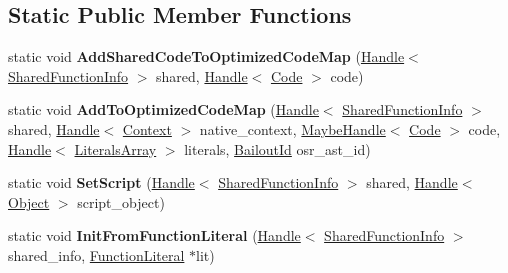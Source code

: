 \subsection*{Static Public Member Functions}
\begin{DoxyCompactItemize}
\item 
static void {\bfseries Add\+Shared\+Code\+To\+Optimized\+Code\+Map} (\hyperlink{classv8_1_1internal_1_1_handle}{Handle}$<$ \hyperlink{classv8_1_1internal_1_1_shared_function_info}{Shared\+Function\+Info} $>$ shared, \hyperlink{classv8_1_1internal_1_1_handle}{Handle}$<$ \hyperlink{classv8_1_1internal_1_1_code}{Code} $>$ code)\hypertarget{classv8_1_1internal_1_1_shared_function_info_af4be709a8a94c530d587790a1a119f1d}{}\label{classv8_1_1internal_1_1_shared_function_info_af4be709a8a94c530d587790a1a119f1d}

\item 
static void {\bfseries Add\+To\+Optimized\+Code\+Map} (\hyperlink{classv8_1_1internal_1_1_handle}{Handle}$<$ \hyperlink{classv8_1_1internal_1_1_shared_function_info}{Shared\+Function\+Info} $>$ shared, \hyperlink{classv8_1_1internal_1_1_handle}{Handle}$<$ \hyperlink{classv8_1_1internal_1_1_context}{Context} $>$ native\+\_\+context, \hyperlink{classv8_1_1internal_1_1_maybe_handle}{Maybe\+Handle}$<$ \hyperlink{classv8_1_1internal_1_1_code}{Code} $>$ code, \hyperlink{classv8_1_1internal_1_1_handle}{Handle}$<$ \hyperlink{classv8_1_1internal_1_1_literals_array}{Literals\+Array} $>$ literals, \hyperlink{classv8_1_1internal_1_1_bailout_id}{Bailout\+Id} osr\+\_\+ast\+\_\+id)\hypertarget{classv8_1_1internal_1_1_shared_function_info_a24eb5e4c8a3293ae99d6688e13999ea7}{}\label{classv8_1_1internal_1_1_shared_function_info_a24eb5e4c8a3293ae99d6688e13999ea7}

\item 
static void {\bfseries Set\+Script} (\hyperlink{classv8_1_1internal_1_1_handle}{Handle}$<$ \hyperlink{classv8_1_1internal_1_1_shared_function_info}{Shared\+Function\+Info} $>$ shared, \hyperlink{classv8_1_1internal_1_1_handle}{Handle}$<$ \hyperlink{classv8_1_1internal_1_1_object}{Object} $>$ script\+\_\+object)\hypertarget{classv8_1_1internal_1_1_shared_function_info_adc527e8da9490e988f9b667d7ef89138}{}\label{classv8_1_1internal_1_1_shared_function_info_adc527e8da9490e988f9b667d7ef89138}

\item 
static void {\bfseries Init\+From\+Function\+Literal} (\hyperlink{classv8_1_1internal_1_1_handle}{Handle}$<$ \hyperlink{classv8_1_1internal_1_1_shared_function_info}{Shared\+Function\+Info} $>$ shared\+\_\+info, \hyperlink{classv8_1_1internal_1_1_function_literal}{Function\+Literal} $\ast$lit)\hypertarget{classv8_1_1internal_1_1_shared_function_info_abd4b11688900f31c3c00da423d6a9283}{}\label{classv8_1_1internal_1_1_shared_function_info_abd4b11688900f31c3c00da423d6a9283}

\end{DoxyCompactItemize}
